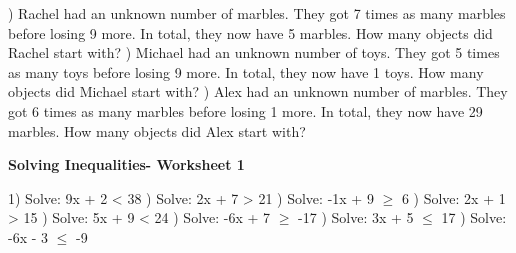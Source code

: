 \documentclass{article}%
\begin{document}
) Rachel had an unknown number of marbles. They got 7 times as many marbles before losing 9 more. In total, they now have 5 marbles. How many objects did Rachel start with?%
\newline%
\newline%
) Michael had an unknown number of toys. They got 5 times as many toys before losing 9 more. In total, they now have 1 toys. How many objects did Michael start with?%
\newline%
\newline%
) Alex had an unknown number of marbles. They got 6 times as many marbles before losing 1 more. In total, they now have 29 marbles. How many objects did Alex start with?%
\newline%
\newline%
\newline%
\pagebreak%
\large%
\begin{center}%
\textbf{Solving Inequalities- Worksheet 1}%
\newline%
\newline%
\newline%
\end{center} \normalsize%
1) Solve: 9x + 2 < 38%
\newline%
\newline%
) Solve: 2x + 7 > 21%
\newline%
\newline%
) Solve: -1x + 9 $\geq$ 6%
\newline%
\newline%
) Solve: 2x + 1 > 15%
\newline%
\newline%
) Solve: 5x + 9 < 24%
\newline%
\newline%
) Solve: -6x + 7 $\geq$ -17%
\newline%
\newline%
) Solve: 3x + 5 $\leq$ 17%
\newline%
\newline%
) Solve: -6x - 3 $\leq$ -9%
\end{document}
